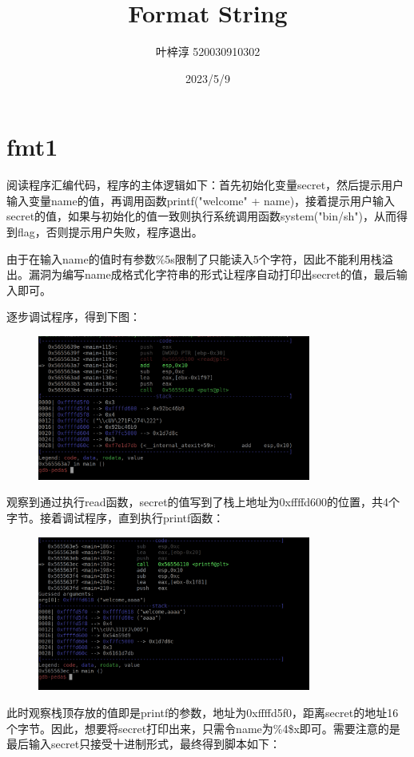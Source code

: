 \documentclass{article}
\date{2023/5/9}
\title{Format String}
\author{叶梓淳 520030910302}
\begin{document}
\maketitle

\section{fmt1}
    阅读程序汇编代码，程序的主体逻辑如下：首先初始化变量secret，然后提示用户输入变量name的值，再调用函数printf("welcome" + name)，接着提示用户输入secret的值，如果与初始化的值一致则执行系统调用函数system("bin/sh")，从而得到flag，否则提示用户失败，程序退出。
    
    由于在输入name的值时有参数\%5s限制了只能读入5个字符，因此不能利用栈溢出。漏洞为编写name成格式化字符串的形式让程序自动打印出secret的值，最后输入即可。
  
    逐步调试程序，得到下图：
    \begin{figure}[H]
		\begin{center}
			\includegraphics[width=0.8\textwidth]{1.png}
		\end{center}
    \end{figure}
    观察到通过执行read函数，secret的值写到了栈上地址为0xffffd600的位置，共4个字节。接着调试程序，直到执行printf函数：
    \begin{figure}[H]
    	\begin{center}
    		\includegraphics[width=0.8\textwidth]{2.png}
    	\end{center}
    \end{figure}
    此时观察栈顶存放的值即是printf的参数，地址为0xffffd5f0，距离secret的地址16个字节。因此，想要将secret打印出来，只需令name为\%4\$x即可。需要注意的是最后输入secret只接受十进制形式，最终得到脚本如下：    
    
\end{document}
